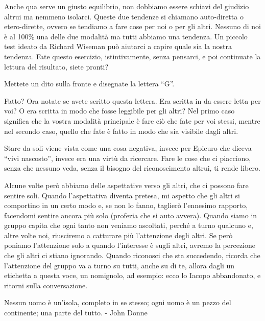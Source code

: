\documentclass[12pt]{book} %
\begin{document}
Anche qua serve un giusto equilibrio, non dobbiamo essere schiavi del giudizio altrui ma nemmeno isolarci. Queste due
tendenze si chiamano auto-diretta o etero-dirette, ovvero se tendiamo a fare cose per noi o per gli altri. Nessuno di
noi è al 100\% una delle due modalità ma tutti abbiamo una tendenza. Un piccolo test ideato da Richard Wiseman può
aiutarci a capire quale sia la nostra tendenza. Fate questo esercizio, istintivamente, senza pensarci, e poi continuate
la lettura del risultato, siete pronti?

Mettete un dito sulla fronte e disegnate la lettera “G”.

Fatto? Ora notate se avete scritto questa lettera. Era scritta in da essere letta per voi? O era scritta in modo che
fosse leggibile per gli altri? Nel primo caso significa che la vostra modalità principale è fare ciò che fate per voi
stessi, mentre nel secondo caso, quello che fate è fatto in modo che sia visibile dagli altri.

Stare da soli viene vista come una cosa negativa, invece per Epicuro che diceva “vivi nascosto”, invece era una virtù da
ricercare. Fare le cose che ci piacciono, senza che nessuno veda, senza il bisogno del riconoscimento altrui, ti rende
libero.

Alcune volte però abbiamo delle aspettative verso gli altri, che ci possono fare sentire soli. Quando
l'aspettativa diventa pretesa, mi aspetto che gli altri si comportino in un certo modo e, se non
lo fanno, taglierò l'ennesimo rapporto, facendomi sentire ancora più solo (profezia che si auto avvera). Quando siamo
in gruppo capita che ogni tanto non veniamo ascoltati, perché a turno qualcuno e, altre volte noi, riusciremo a
catturare più l'attenzione degli altri. Se però poniamo l'attenzione solo a
quando l'interesse è sugli altri, avremo la percezione che gli altri ci stiano ignorando. Quando
riconosci che sta succedendo, ricorda che l'attenzione del gruppo va a turno su tutti, anche su di
te, allora dagli un etichetta a questa voce, un nomignolo, ad esempio: ecco lo Iacopo abbandonato, e ritorni sulla
conversazione.


\bigskip

{\textquotedbl}Nessun uomo è un'isola, completo in se stesso; ogni uomo è un pezzo del continente; una parte del
tutto.{\textquotedbl} - John Donne 
\end{document}

